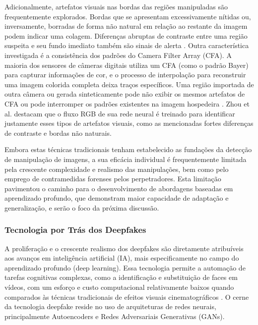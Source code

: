 Adicionalmente, artefatos visuais nas bordas das regiões manipuladas são frequentemente explorados. Bordas que se apresentam excessivamente nítidas ou, inversamente, borradas de forma não natural em relação ao restante da imagem podem indicar uma colagem. Diferenças abruptas de contraste entre uma região suspeita e seu fundo imediato também são sinais de alerta \cite{zhou2018manipulation}. Outra característica investigada é a consistência dos padrões do Camera Filter Array (CFA). A maioria dos sensores de câmeras digitais utiliza um CFA (como o padrão Bayer) para capturar informações de cor, e o processo de interpolação para reconstruir uma imagem colorida completa deixa traços específicos. Uma região importada de outra câmera ou gerada sinteticamente pode não exibir os mesmos artefatos de CFA ou pode interromper os padrões existentes na imagem hospedeira \cite{zhou2018manipulation}. Zhou et al. \cite{zhou2018manipulation} destacam que o fluxo RGB de sua rede neural é treinado para identificar justamente esses tipos de artefatos visuais, como as mencionadas fortes diferenças de contraste e bordas não naturais.

Embora estas técnicas tradicionais tenham estabelecido as fundações da detecção de manipulação de imagens, a sua eficácia individual é frequentemente limitada pela crescente complexidade e realismo das manipulações, bem como pelo emprego de contramedidas forenses pelos perpetradores. Esta limitação pavimentou o caminho para o desenvolvimento de abordagens baseadas em aprendizado profundo, que demonstram maior capacidade de adaptação e generalização, e serão o foco da próxima discussão.

\subsubsection{Tecnologia por Trás dos Deepfakes}
\label{tecnologia por trás dos deepfakes}

A proliferação e o crescente realismo dos deepfakes são diretamente atribuíveis aos avanços em inteligência artificial (IA), mais especificamente no campo do aprendizado profundo (deep learning). Essa tecnologia permite a automação de tarefas cognitivas complexas, como a identificação e substituição de faces em vídeos, com um esforço e custo computacional relativamente baixos quando comparados às técnicas tradicionais de efeitos visuais cinematográficos \cite{langguth2021dont}. O cerne da tecnologia deepfake reside no uso de arquiteturas de redes neurais, principalmente Autoencoders e Redes Adversariais Generativas (GANs).

